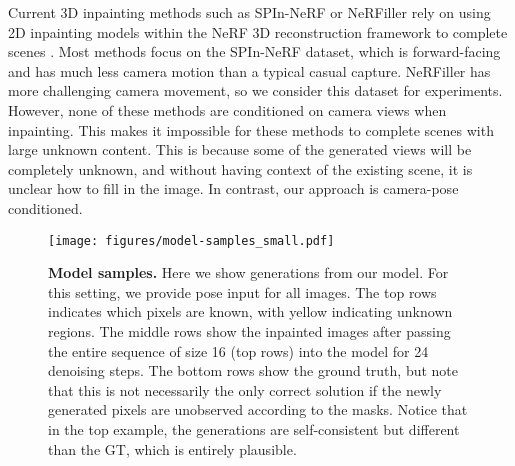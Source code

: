 Current 3D inpainting methods such as SPIn-NeRF \cite{mirzaei2023spin} or NeRFiller \cite{weber2024nerfiller} rely on using 2D inpainting models within the NeRF 3D reconstruction framework to complete scenes \cite{ShihMHCCK2024}.
Most methods \cite{CaoYFWX2024,ChenCSXZ2024,LinKHLMKYT2024,ChenLP2024} focus on the SPIn-NeRF dataset, which is forward-facing and has much less camera motion than a typical casual capture.
NeRFiller has more challenging camera movement, so we consider this dataset for experiments.
However, none of these methods are conditioned on camera views when inpainting.
This makes it impossible for these methods to complete scenes with large unknown content.
This is because some of the generated views will be completely unknown, and without having context of the existing scene, it is unclear how to fill in the image.
In contrast, our approach is camera-pose conditioned.

\begin{figure*}[t]
\centering
\texttt{[image: figures/model-samples\_small.pdf]}
\vspace{-15px}
\caption{\label{fig:model_samples}%
    \textbf{Model samples.}
    Here we show generations from our model.
    For this setting, we provide pose input for all images.
    The top rows indicates which pixels are known, with yellow indicating unknown regions.
    The middle rows show the inpainted images after passing the entire sequence of size 16 (top rows) into the model for 24 denoising steps.
    The bottom rows show the ground truth, but note that this is not necessarily the only correct solution if the newly generated pixels are unobserved according to the masks.
    Notice that in the top example, the generations are self-consistent but different than the GT, which is entirely plausible.
    \vspace{-1em}
}
\end{figure*}

\vspace{-5px}